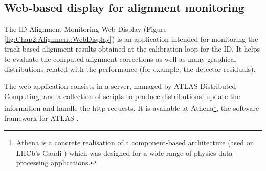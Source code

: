 \subsection{Web-based display for alignment monitoring}
The ID Alignment Monitoring Web Display (Figure \ref{fig:Chap2:Alignment:WebDisplay}) is an application intended for monitoring the track-based
alignment results obtained at the calibration loop for the ID. It helps to evaluate the computed 
alignment corrections as well as many graphical distributions related with the performance 
(for example, the detector residuals). 

The web application consists in a server, managed by ATLAS Distributed Computing, and a
collection of scripts to produce distributions, update the information and handle the http requests.
It is available at Athena\footnote{Athena is a
concrete realisation of a component-based architecture (ased on LHCb's Gaudi \cite{Mato:1998gfa}) 
which was designed for a wide range of physics data-processing applications.}, 
the software framework for ATLAS \cite{Duckeck:2005rb}. 

